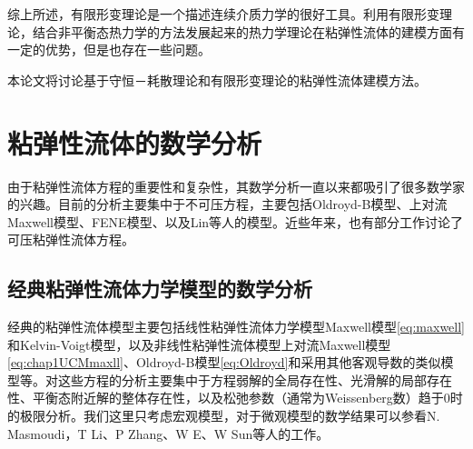 综上所述，有限形变理论是一个描述连续介质力学的很好工具。利用有限形变理论，结合非平衡态热力学的方法发展起来的热力学理论在粘弹性流体的建模方面有一定的优势，但是也存在一些问题。

本论文将讨论基于守恒－耗散理论和有限形变理论的粘弹性流体建模方法。

\section{粘弹性流体的数学分析}
由于粘弹性流体方程的重要性和复杂性，其数学分析一直以来都吸引了很多数学家的兴趣\cite{lin2012some,li2007mathematical,weinan2002convergence,fabrizio1992mathematical,renardy2008mathematical,joseph1987hyperbolicity,guillope2010regular,saut2012lectures,yong2014newtonian,qian2010well,hu2011global,lei2005global,fang2014incompressible}。目前的分析主要集中于不可压方程，主要包括Oldroyd-B模型、上对流Maxwell模型、FENE模型、以及Lin等人的模型\cite{elgindi2015global,saut2012lectures,renardy2000mathematical,masmoudi2011global,lions2000global,masmoudi2008well,lei2010remarks}。近些年来，也有部分工作讨论了可压粘弹性流体方程\cite{fang2014incompressible,hu2012strong,qian2010global,qian2011initial}。
\subsection{经典粘弹性流体力学模型的数学分析}
经典的粘弹性流体模型主要包括线性粘弹性流体力学模型Maxwell模型\eqref{eq:maxwell}和Kelvin-Voigt模型，以及非线性粘弹性流体模型上对流Maxwell模型\eqref{eq:chap1UCMmaxll}、Oldroyd-B模型\eqref{eq:Oldroyd}和采用其他客观导数的类似模型等。对这些方程的分析主要集中于方程弱解的全局存在性、光滑解的局部存在性、平衡态附近解的整体存在性，以及松弛参数（通常为Weissenberg数）趋于$0$时的极限分析。我们这里只考虑宏观模型，对于微观模型的数学结果可以参看N. Masmoudi，T Li、P Zhang、W E、W Sun等人的工作\cite{masmoudi2013global,masmoudi2008well,li2007mathematical,li2004local,li2004well,lions2007global,weinan2002convergence,constantin2010remarks}。

